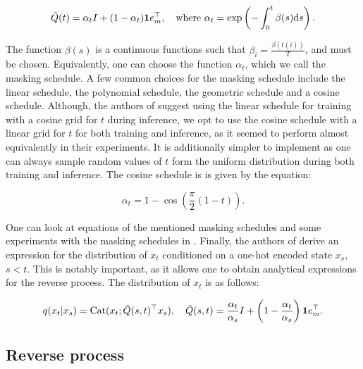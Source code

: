 \begin{equation*}
    \bar{Q}(t) = \alpha_tI + (1 - \alpha_t)\bold{1}e_m^\top, \quad\text{where }\alpha_t = \exp\left( -\int_{0}^{t}\beta(s)\mathrm{d}s \right).
\end{equation*}

The function $\beta(s)$ is a continuous functions such that $\beta_i = \frac{\beta(t(i))}{T}$, and must be chosen. Equivalently, one can choose the function $\alpha_t$, which we call the masking schedule. A few common choices for the masking schedule include the linear schedule, the polynomial schedule, the geometric schedule and a cosine schedule. Although, the authors of \cite{shi2025simplifiedgeneralizedmaskeddiffusion} suggest using the linear schedule for training with a cosine grid for $t$ during inference, we opt to use the cosine schedule with a linear grid for $t$ for both training and inference, as it seemed to perform almost equivalently in their experiments. It is additionally simpler to implement as one can always sample random values of $t$ form the uniform distribution during both training and inference. The cosine schedule is is given by the equation:

\begin{equation*}
    \alpha_t = 1 - \cos(\frac{\pi}{2}(1 - t)).
\end{equation*}

One can look at equations of the mentioned masking schedules and some experiments with the masking schedules in \cite{shi2025simplifiedgeneralizedmaskeddiffusion}. Finally, the authors of \cite{shi2025simplifiedgeneralizedmaskeddiffusion} derive an expression for the distribution of $x_t$ conditioned on a one-hot encoded state $x_s$, $s < t$. This is notably important, as it allows one to obtain analytical expressions for the reverse process. The distribution of $x_t$ is as follows:

\begin{equation}
    q(x_t | x_s) = \text{Cat}(x_t; \bar{Q}(s, t)^\top x_s), \quad\bar{Q}(s, t) = \frac{\alpha_t}{\alpha_s}I + \left(1 - \frac{\alpha_t}{\alpha_s}\right)\bold{1}e_m^\top.  %
    \label{eq:x_t dist cond x_s}
\end{equation}



\subsection{Reverse process}

